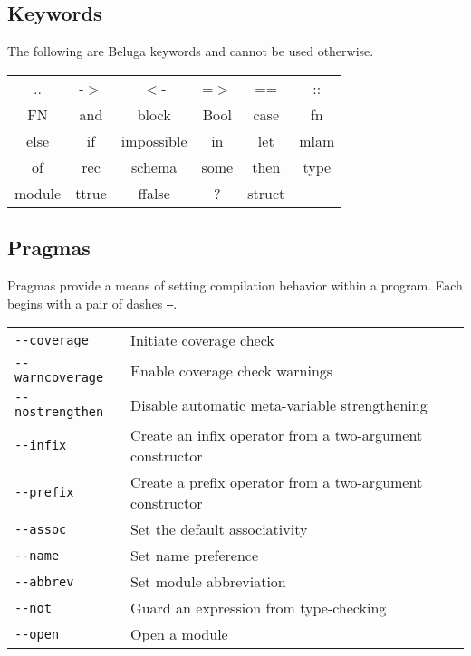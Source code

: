 \documentclass[11pt]{article}
\begin{document}

\subsection{Keywords}
The following are Beluga keywords and cannot be used otherwise.
\begin{center}
\renewcommand{\arraystretch}{2}
\begin{tabular}{ c c c c c c }
.. & -$>$ & $<$-  & =$>$ &  ==  & :: \\
FN & and & block & Bool & case & fn \\
else & if & impossible & in & let & mlam \\
of & rec & schema & some & then & type \\
module & ttrue & ffalse & ? & struct &  \\
\end{tabular}
\end{center}

\subsection{Pragmas}
Pragmas provide a means of setting compilation behavior within a program. Each begins with a pair of dashes \texttt{--}. \\

\begin{tabular}{ | l l}
\texttt{-{}-coverage} & Initiate coverage check \\
\texttt{-{}-warncoverage} & Enable coverage check warnings \\
\texttt{-{}-nostrengthen} & Disable automatic meta-variable strengthening \\
\texttt{-{}-infix} & Create an infix operator from a two-argument constructor \\
\texttt{-{}-prefix} & Create a prefix operator from a two-argument constructor \\
\texttt{-{}-assoc} & Set the default associativity \\
\texttt{-{}-name} & Set name preference \\
\texttt{-{}-abbrev} & Set module abbreviation \\
\texttt{-{}-not} & Guard an expression from type-checking\\
\texttt{-{}-open} & Open a module\\
\end{tabular}
\end{document}

